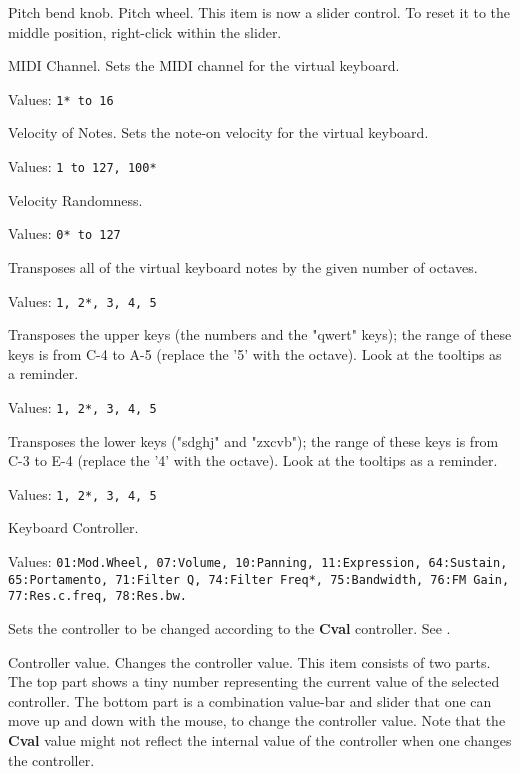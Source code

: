    Pitch bend knob. Pitch wheel.
   This item is now a slider control.  To reset it to the middle position,
   right-click within the slider.

%

   MIDI Channel.
   Sets the MIDI channel for the virtual keyboard.

   Values: \texttt{1* to 16}

   Velocity of Notes.
   Sets the note-on velocity for the virtual keyboard.

   Values: \texttt{1 to 127, 100*}

   Velocity Randomness.

   Values: \texttt{0* to 127}

   Transposes all of the virtual keyboard notes by the given number of
   octaves.

   Values: \texttt{1, 2*, 3, 4, 5}

   Transposes the upper keys (the numbers and the "qwert" keys);
   the range of these keys is from C-4 to A-5 (replace the '5' with the octave).
   Look at the tooltips as a reminder.

   Values: \texttt{1, 2*, 3, 4, 5}

   Transposes the lower keys ("sdghj" and "zxcvb"); the range of these keys is
   from C-3 to E-4 (replace the '4' with the octave).  Look at the tooltips as a
   reminder.

   Values: \texttt{1, 2*, 3, 4, 5}

   Keyboard Controller.

   Values: \texttt{01:Mod.Wheel, 07:Volume, 10:Panning,
      11:Expression, 64:Sustain, 65:Portamento, 71:Filter Q,
      74:Filter Freq*, 75:Bandwidth, 76:FM Gain,
      77:Res.c.freq, 78:Res.bw.}

   Sets the controller to be changed according to the \textbf{Cval}
   controller.
   See .

   Controller value.
   Changes the controller value.
   This item consists of two parts.  The top part shows a tiny
   number representing the current value of the selected controller.
   The bottom part is a combination value-bar and slider that one
   can move up and down with the mouse, to change the controller value.
   Note that the \textbf{Cval} value might not reflect the
   internal value of the controller when one changes the controller.

